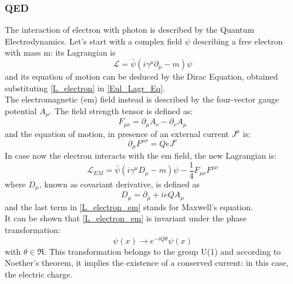 \subsubsection{QED}\label{QED}
The interaction of electron with photon is described by the Quantum Electrodynamics. 
Let's start with a complex field $\psi$ describing a free electron with mass m: its Lagrangian is
\begin{equation}
\mathcal{L} = \bar{\psi}(i\gamma^{\mu}\partial_{\mu}-m)\psi
\label{L_electron}
\end{equation}
and its equation of motion can be deduced by the Dirac Equation, obtained substituting \ref{L_electron} in \ref{Eul_Lagr_Eq}. \\
The electromagnetic (em)  field instead is described by the four-vector gauge potential $A_{\mu}$. The field strength tensor is defined as:
\begin{equation}
F_{\mu\nu} = \partial_{\mu}A_{\nu} - \partial_{\nu}A_{\mu}
\label{F_em}
\end{equation}
and the equation of motion, in presence of an external current $J^{\mu}$ is:
\begin{equation}
\partial_{\mu}F^{\mu\nu} = QeJ^{\nu}
\label{Motion_em}
\end{equation}
In case now the electron interacts with the em field, the new Lagrangian is:
\begin{equation}
\mathcal{L}_{EM} = \bar{\psi}(i\gamma^{\mu}D_{\mu}-m)\psi - \frac{1}{4}F_{\mu\nu}F^{\mu\nu}
\label{L_electron_em}
\end{equation}
where $D_{\mu}$, known as covariant derivative, is defined as
\begin{equation}
D_{\mu} = \partial_{\mu} + ieQA_{\mu}
\label{D_covariante}
\end{equation}
and the last term in \ref{L_electron_em} stands for Maxwell's equation. \\
It can be shown that \ref{L_electron_em} is invariant under the phase transformation:
\begin{equation}
\psi(x)\to e^{-iQ\theta} \psi(x)
\label{global_trans}
\end{equation}
with $\theta \in \Re$. This transformation belongs to the group U(1) and according to Noether's theorem, it implies the existence of a conserved current: in this case, the electric charge.
